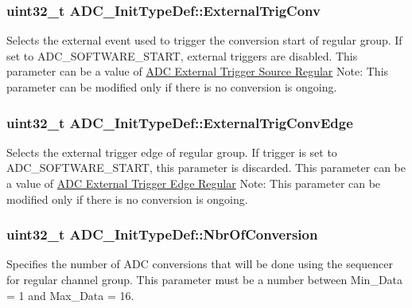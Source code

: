 \subsubsection[{\texorpdfstring{External\+Trig\+Conv}{ExternalTrigConv}}]{\setlength{\rightskip}{0pt plus 5cm}uint32\+\_\+t A\+D\+C\+\_\+\+Init\+Type\+Def\+::\+External\+Trig\+Conv}\hypertarget{struct_a_d_c___init_type_def_a47aba277f9d8f3c5774983de4ce9455b}{}\label{struct_a_d_c___init_type_def_a47aba277f9d8f3c5774983de4ce9455b}
Selects the external event used to trigger the conversion start of regular group. If set to A\+D\+C\+\_\+\+S\+O\+F\+T\+W\+A\+R\+E\+\_\+\+S\+T\+A\+RT, external triggers are disabled. This parameter can be a value of \hyperlink{group___a_d_c___external__trigger___source___regular}{A\+DC External Trigger Source Regular} Note\+: This parameter can be modified only if there is no conversion is ongoing. 
\subsubsection[{\texorpdfstring{External\+Trig\+Conv\+Edge}{ExternalTrigConvEdge}}]{\setlength{\rightskip}{0pt plus 5cm}uint32\+\_\+t A\+D\+C\+\_\+\+Init\+Type\+Def\+::\+External\+Trig\+Conv\+Edge}\hypertarget{struct_a_d_c___init_type_def_aeed14631d5f1d118a252ea24edd68ede}{}\label{struct_a_d_c___init_type_def_aeed14631d5f1d118a252ea24edd68ede}
Selects the external trigger edge of regular group. If trigger is set to A\+D\+C\+\_\+\+S\+O\+F\+T\+W\+A\+R\+E\+\_\+\+S\+T\+A\+RT, this parameter is discarded. This parameter can be a value of \hyperlink{group___a_d_c___external__trigger__edge___regular}{A\+DC External Trigger Edge Regular} Note\+: This parameter can be modified only if there is no conversion is ongoing. 
\subsubsection[{\texorpdfstring{Nbr\+Of\+Conversion}{NbrOfConversion}}]{\setlength{\rightskip}{0pt plus 5cm}uint32\+\_\+t A\+D\+C\+\_\+\+Init\+Type\+Def\+::\+Nbr\+Of\+Conversion}\hypertarget{struct_a_d_c___init_type_def_aa72b0cc3e8dac3a30097cf12093c42a7}{}\label{struct_a_d_c___init_type_def_aa72b0cc3e8dac3a30097cf12093c42a7}
Specifies the number of A\+DC conversions that will be done using the sequencer for regular channel group. This parameter must be a number between Min\+\_\+\+Data = 1 and Max\+\_\+\+Data = 16. 

